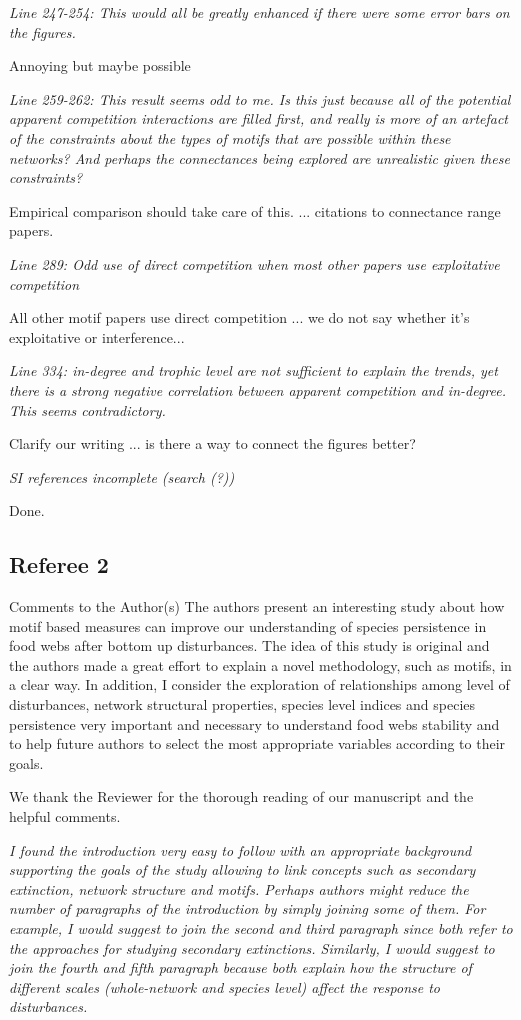 \documentclass[12pt]{article}
\newcommand{\us}{\rm \setlength{\leftskip}{0.3cm} \setlength{\rightskip}{0.3cm}}
\newcommand{\them}{\it \setlength{\leftskip}{0cm} \setlength{\rightskip}{0cm}}
\begin{document}
\them
Line 247-254: This would all be greatly enhanced if there were some error bars on the figures.

\us Annoying but maybe possible

\them
Line 259-262: This result seems odd to me. Is this just because all of the potential apparent competition interactions are filled first, and really is more of an artefact of the constraints about the types of motifs that are possible within these networks? And perhaps the connectances being explored are unrealistic given these constraints?

\us Empirical comparison should take care of this. ... citations to connectance range papers.

\them
Line 289: Odd use of direct competition when most other papers use exploitative competition

\us All other motif papers use direct competition ... we do not say whether it's exploitative or interference...

\them
Line 334: in-degree and trophic level are not sufficient to explain the trends, yet there is a strong negative correlation between apparent competition and in-degree. This seems contradictory.

\us Clarify our writing ... is there a way to connect the figures better?

\them
SI references incomplete (search (?))

\us
Done.

\subsection*{Referee 2}


Comments to the Author(s)
The authors present an interesting study about how motif based measures can improve our understanding of species persistence in food webs after bottom up disturbances. The idea of this study is original and the authors made a great effort to explain a novel methodology, such as motifs, in a clear way. In addition, I consider the exploration of relationships among level of disturbances, network structural properties, species level indices and species persistence very important and necessary to understand food webs stability and to help future authors to select the most appropriate variables according to their goals.

\us
We thank the Reviewer for the thorough reading of our manuscript and the helpful comments. 

\them
I found the introduction very easy to follow with an appropriate background supporting the goals of the study allowing to link concepts such as secondary extinction, network structure and motifs. Perhaps authors might reduce the number of paragraphs of the introduction by simply joining some of them. For example, I would suggest to join the second and third paragraph since both refer to the approaches for studying secondary extinctions. Similarly, I would suggest to join the fourth and fifth paragraph because both explain how the structure of different scales (whole-network and species level) affect the response to disturbances.
\end{document}
